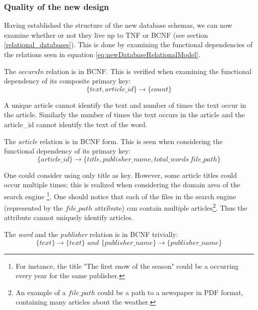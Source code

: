 \subsubsection*{Quality of the new design}
Having established the structure of the new database schemas, we can now examine whether or not they live up to TNF or BCNF (see section \ref{relational_databases}).
This is done by examining the functional dependencies of the relations seen in equation \ref{eq:newDatabaseRelationalModel}.

The \textit{occursIn} relation is in BCNF. 
This is verified when examining the functional dependency of its composite primary key:
\begin{equation*}
 \{text,article\_id\}\rightarrow \{count\}   
\end{equation*}

A unique article cannot identify the text and number of times the text occur in the article.
Similarly the number of times the text occurs in the article and the article\_id cannot identify the text of the word.

The \textit{article} relation is in BCNF form. 
This is seen when considering the functional dependency of its primary key:
\begin{equation*}
    \{article\_id\} \rightarrow \{title, publisher\_name,total\_words\, file\_path\}
\end{equation*}

One could consider using only title as key. 
However, some article titles could occur multiple times; this is realized when considering the domain area of the \knox{} search engine
\footnote{For instance, the title "The first snow of the season" could be a occurring every year for the same publisher.}.
One should notice that each of the files in the search engine (represented by the $file\_path$ attribute) can contain multiple articles\footnote{An example of a $file\_path$ could be a path to a newspaper in PDF format, containing many articles about the weather.}.
Thus the attribute cannot uniquely identify articles. 

The \textit{word} and the \textit{publisher} relation is in BCNF trivially:
\begin{equation*}
    \{ text\} \rightarrow \{text\} \textit{\ and\ } \{ publisher\_name \} \rightarrow \{ publisher\_name\}
\end{equation*}


